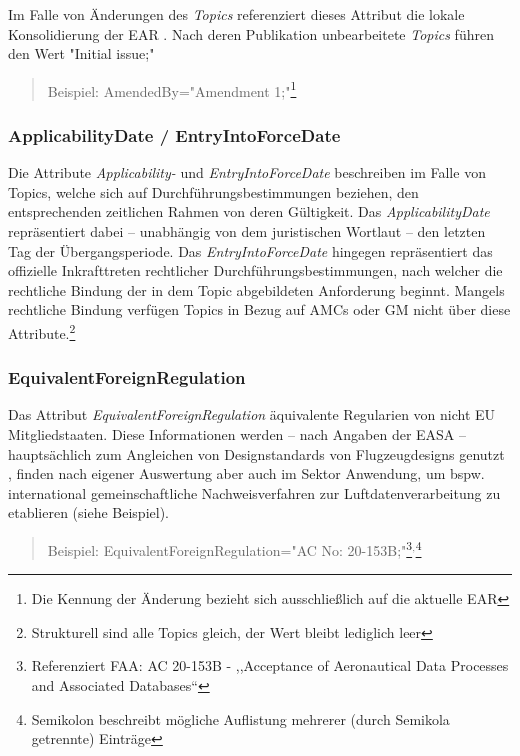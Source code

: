 Im Falle von Änderungen des \textit{Topics} referenziert dieses Attribut die lokale Konsolidierung der \ac{EAR}
\cite[21]{easa_xml_doc}.
Nach deren Publikation unbearbeitete \textit{Topics} führen den Wert \textsf{"{}Initial issue;"}

\begin{quote}
    Beispiel:
    \textsf{AmendedBy="{}Amendment 1;"}\footnote{Die Kennung der Änderung bezieht sich ausschließlich auf die aktuelle \ac{EAR}}
\end{quote}
    
    \subsubsection{ApplicabilityDate / EntryIntoForceDate }

Die Attribute \textit{Applicability-} und \textit{EntryIntoForceDate} beschreiben im Falle von Topics, welche sich auf Durchführungsbestimmungen beziehen, den entsprechenden zeitlichen Rahmen von deren Gültigkeit.
Das \textit{ApplicabilityDate} repräsentiert dabei -- unabhängig von dem juristischen Wortlaut -- den letzten Tag der Übergangsperiode. 
Das \textit{EntryIntoForceDate} hingegen repräsentiert das offizielle Inkrafttreten rechtlicher Durchführungsbestimmungen, nach welcher die rechtliche Bindung der in dem Topic abgebildeten Anforderung beginnt.
\cite[21]{easa_xml_doc}
Mangels rechtliche Bindung verfügen Topics in Bezug auf \acsp{AMC} oder \ac{GM} nicht über diese Attribute.\footnote{Strukturell sind alle Topics gleich, der Wert bleibt lediglich leer}
    
    \subsubsection{EquivalentForeignRegulation}

Das Attribut \textit{EquivalentForeignRegulation} äquivalente Regularien von nicht \ac{EU} Mitgliedstaaten.
Diese Informationen werden -- nach Angaben der \ac{EASA} -- hauptsächlich zum Angleichen von Designstandards von Flugzeugdesigns genutzt \cite[22]{easa_xml_doc}, finden nach eigener Auswertung aber auch im \atmans Sektor Anwendung, um bspw. international gemeinschaftliche Nachweisverfahren zur Luftdatenverarbeitung zu etablieren (siehe Beispiel).

\begin{quote}
    Beispiel:
    \textsf{EquivalentForeignRegulation="{}AC No: 20-153B;"}\footnote{Referenziert \ac{FAA}: \ac{AC} 20-153B - ,,Acceptance of Aeronautical Data Processes and Associated Databases``}$^,$\footnote{Semikolon beschreibt mögliche Auflistung mehrerer (durch Semikola getrennte) Einträge }
\end{quote}

